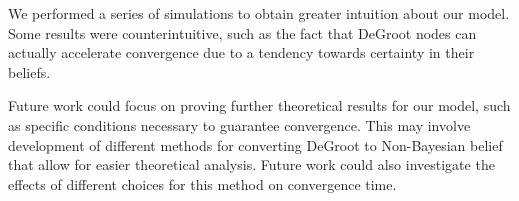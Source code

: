\documentclass[letterpaper, 11pt, conference]{ieeeconf}
\begin{document}
We performed a series of simulations to obtain greater intuition about our model.  Some results were counterintuitive, such as the fact that DeGroot nodes can actually accelerate convergence due to a tendency towards certainty in their beliefs.

Future work could focus on proving further theoretical results for our model, such as specific conditions necessary to guarantee convergence.  This may involve development of different methods for converting DeGroot to Non-Bayesian belief that allow for easier theoretical analysis.  Future work could also investigate the effects of different choices for this method on convergence time.



\end{document}
